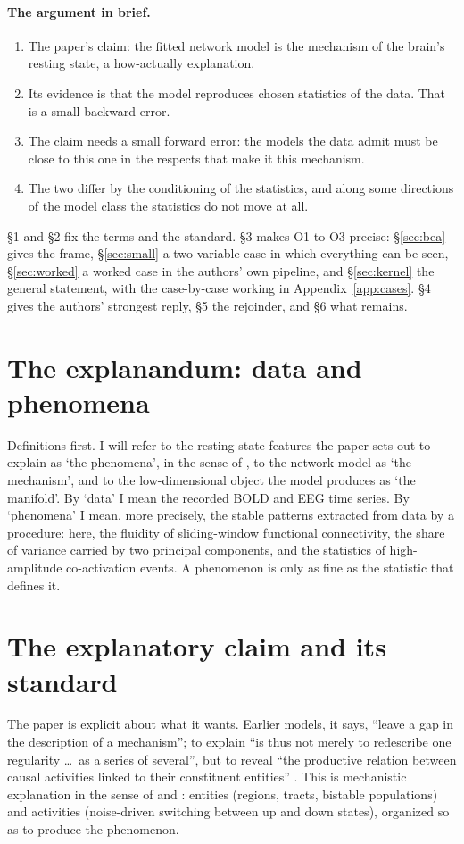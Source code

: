 \documentclass[11pt]{article}
\newenvironment{newtext}{\par\color{teal!55!black}}{\par}
\begin{document}
\begin{newtext}
\paragraph{The argument in brief.}
\begin{enumerate}
\item[C] The paper's claim: the fitted network model is the mechanism of the brain's resting state, a how-actually explanation.
\item[O1] Its evidence is that the model reproduces chosen statistics of the data. That is a small backward error.
\item[O2] The claim needs a small forward error: the models the data admit must be close to this one in the respects that make it this mechanism.
\item[O3] The two differ by the conditioning of the statistics, and along some directions of the model class the statistics do not move at all.
\end{enumerate}
\S1 and \S2 fix the terms and the standard. \S3 makes O1 to O3 precise: \S\ref{sec:bea} gives the frame, \S\ref{sec:small} a two-variable case in which everything can be seen, \S\ref{sec:worked} a worked case in the authors' own pipeline, and \S\ref{sec:kernel} the general statement, with the case-by-case working in Appendix~\ref{app:cases}. \S4 gives the authors' strongest reply, \S5 the rejoinder, and \S6 what remains.
\end{newtext}

\section{The explanandum: data and phenomena}
Definitions first. I will refer to the resting-state features the paper sets out to explain as `the phenomena', in the sense of \textcite{bogen1988}, to the network model as `the mechanism', and to the low-dimensional object the model produces as `the manifold'. By `data' I mean the recorded BOLD and EEG time series. By `phenomena' I mean, more precisely, the stable patterns extracted from data by a procedure: here, the fluidity of sliding-window functional connectivity, the share of variance carried by two principal components, and the statistics of high-amplitude co-activation events. A phenomenon is only as fine as the statistic that defines it.


\section{The explanatory claim and its standard}
The paper is explicit about what it wants. Earlier models, it says, ``leave a gap in the description of a mechanism''; to explain ``is thus not merely to redescribe one regularity \ldots\ as a series of several'', but to reveal ``the productive relation between causal activities linked to their constituent entities'' \parencite[Introduction]{fousek2024}. This is mechanistic explanation in the sense of \textcite{mdc2000} and \textcite{craver2007}: entities (regions, tracts, bistable populations) and activities (noise-driven switching between up and down states), organized so as to produce the phenomenon.
\end{document}
